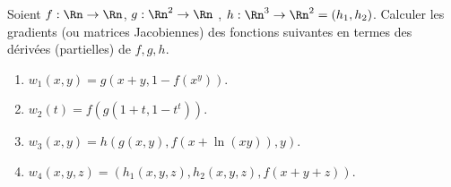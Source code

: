 
\begin{exercice}\label{exo0057}

Soient $f:\Rn \rightarrow  \Rn$, $g:\Rn^2\rightarrow \Rn$ , $h:\Rn^3\rightarrow  \Rn^2 =  (h_1, h_2)$. Calculer les gradients (ou matrices Jacobiennes) des fonctions suivantes en termes des dérivées (partielles) de $f,g,h$.
\begin{enumerate}
\item $w_1(x,y)=g(x+y, 1-f(x^y))$. 
\item $w_2(t)=f(g(1+t, 1-t^t))$.
\item $w_3(x,y)=h(g(x,y), f(x+\ln(xy)), y)$.
\item $ w_4(x,y,z)=(h_1(x,y,z), h_2(x,y,z), f(x+y+z))$.
\end{enumerate}


\end{exercice}
